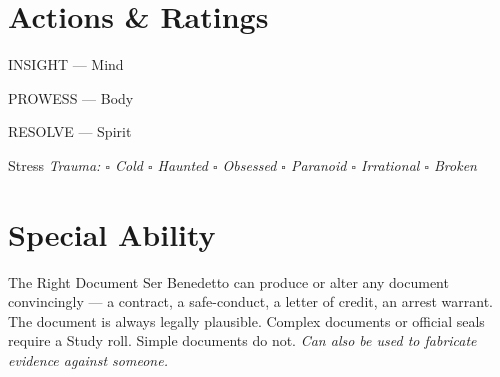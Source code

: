 \section*{Actions \& Ratings}
\begin{attributoblock}[SpinolaRed]{INSIGHT --- Mind}
\end{attributoblock}
\begin{attributoblock}[SpinolaRed]{PROWESS --- Body}
\end{attributoblock}
\begin{attributoblock}[SpinolaRed]{RESOLVE --- Spirit}
\end{attributoblock}

\medskip
\begin{pgclockbox}{Stress \hfill {}}
\small\textit{Trauma: $\square$ Cold \quad $\square$ Haunted \quad $\square$ Obsessed \quad $\square$ Paranoid \quad $\square$ Irrational \quad $\square$ Broken}
\end{pgclockbox}

\section*{Special Ability}
\begin{spinolabox}{The Right Document}
Ser Benedetto can produce or alter any document convincingly --- a contract, a
safe-conduct, a letter of credit, an arrest warrant. The document is always legally
plausible. Complex documents or official seals require a Study roll. Simple documents
do not. \textit{Can also be used to fabricate evidence against someone.}
\end{spinolabox}

